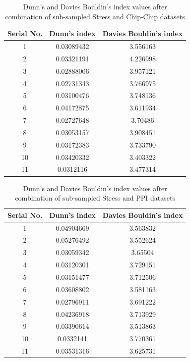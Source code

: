 \begin{table}[p]
\centering
\begin{tabular}{|c|c|c|}
\hline
Serial No. & Dunn’s index  & Davies Bouldin’s index\\
\hline
1 & 0.03089432 & 3.556163 \\
2 & 0.03321191 & 4.226998 \\
3 & 0.02888006 & 3.957121 \\
4 & 0.02731343 & 3.766975 \\
5 & 0.03100476 & 3.748136 \\
6 & 0.04172875 & 3.611934 \\
7 & 0.02727648 & 3.70486 \\
8 & 0.03053157 & 3.908451 \\
9 & 0.03172383 & 3.733790 \\
10 & 0.03420332 & 3.403322 \\
11 & 0.0312116 & 3.477314 \\
\hline 
\end{tabular}
\caption{Dunn's and Davies Bouldin's index values after combination of sub-sampled Stress and Chip-Chip datasets}
\label{tab:stress_chip_perturbed}
\end{table}


\begin{table}[p]
\centering
\begin{tabular}{|c|c|c|}
\hline
Serial No. & Dunn’s index  & Davies Bouldin’s index\\
\hline
1 & 0.04904669 & 3.563832 \\
2 & 0.05276492 & 3.552624 \\
3 & 0.03059342 & 3.65504 \\
4 & 0.03120301 & 3.729151 \\
5 & 0.03151477 & 3.712506 \\
6 & 0.03608802 & 3.581163 \\
7 & 0.02796911 & 3.691222 \\
8 & 0.04236918 & 3.713929 \\
9 & 0.03390614 & 3.513863 \\
10 & 0.0332141 & 3.770361 \\
11 & 0.03531316 & 3.625731 \\
\hline 
\end{tabular}
\caption{Dunn's and Davies Bouldin's index values after combination of sub-sampled Stress and PPI datasets}
\label{tab:stress_ppi_perturbed}
\end{table}

